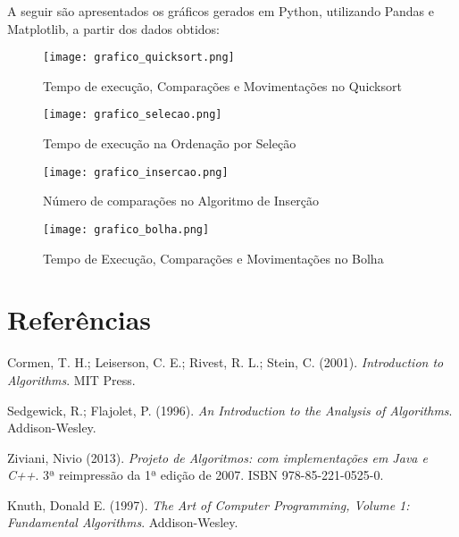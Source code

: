 \documentclass[12pt]{article}
\begin{document}
A seguir são apresentados os gráficos gerados em Python, utilizando Pandas e Matplotlib, a partir dos dados obtidos:

\begin{figure}[H]
\centering
\texttt{[image: grafico\_quicksort.png]}
\caption{Tempo de execução, Comparações e Movimentações no Quicksort}
\end{figure}

\begin{figure}[H]
\centering
\texttt{[image: grafico\_selecao.png]}
\caption{Tempo de execução na Ordenação por Seleção}
\end{figure}

\begin{figure}[H]
\centering
\texttt{[image: grafico\_insercao.png]}
\caption{Número de comparações no Algoritmo de Inserção}
\end{figure}

\begin{figure}[H]
\centering
\texttt{[image: grafico\_bolha.png]}
\caption{Tempo de Execução, Comparações e Movimentações no Bolha}
\end{figure}

\clearpage

\section{Referências}

\begin{thebibliography}{99}

 Cormen, T. H.; Leiserson, C. E.; Rivest, R. L.; Stein, C. (2001). \textit{Introduction to Algorithms}. MIT Press.

 Sedgewick, R.; Flajolet, P. (1996). \textit{An Introduction to the Analysis of Algorithms}. Addison-Wesley.

 Ziviani, Nivio (2013). \textit{Projeto de Algoritmos: com implementações em Java e C++}. 3ª reimpressão da 1ª edição de 2007. ISBN 978-85-221-0525-0.

 Knuth, Donald E. (1997). \textit{The Art of Computer Programming, Volume 1: Fundamental Algorithms}. Addison-Wesley.

\end{thebibliography}
\end{document}
